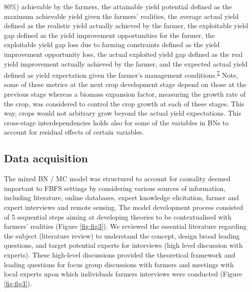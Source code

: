 \documentclass[12pt,oneside]{article}
\begin{document}
80\%) achievable by the farmers, the attainable yield potential defined as the maximum achievable yield given the farmers' realities, the average actual yield defined as the realistic yield actually achieved by the farmer, the exploitable yield gap defined as the yield improvement opportunities for the farmer, the exploitable yield gap loss due to farming constraints defined as the yield improvement opportunity loss, the actual exploited yield gap defined as the real yield improvement actually achieved by the farmer, and the expected actual yield defined as yield expectation given the farmer's management conditions.\textsuperscript{\protect\hyperlink{ref-VanIttersum_et_al_2013}{7}} Note, some of these metrics at the next crop development stage depend on those at the previous stage whereas a biomass expansion factor, measuring the growth rate of the crop, was considered to control the crop growth at each of these stages. This way, crops would not arbitrary grow beyond the actual yield expectations. This cross-stage interdependencies holds also for some of the variables in BNs to account for residual effects of certain variables.

\hypertarget{III2}{%
\subsection{Data acquisition}\label{III2}}

The mixed BN / MC model was structured to account for causality deemed important to FBFS settings by considering various sources of information, including literature, online databases, expert knowledge elicitation, farmer and expert interviews and remote sensing. The model development process consisted of 5 sequential steps aiming at developing theories to be contextualised with farmers' realities (Figure \ref{fig:fig3}). We reviewed the essential literature regarding the subject (literature review) to understand the concept, design broad leading questions, and target potential experts for interviews (high level discussion with experts). These high-level discussions provided the theoretical framework and leading questions for focus group discussions with farmers and meetings with local experts upon which individuals farmers interviews were conducted (Figure \ref{fig:fig3}).
\end{document}
